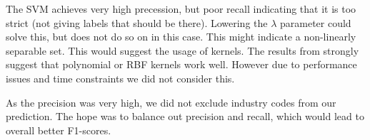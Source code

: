 \documentclass{article}
\begin{document}
The SVM achieves very high precession, but poor recall indicating that it is too strict (not giving labels that should be there). Lowering the $\lambda$ parameter could solve this, but does not do so on in this case. This might indicate a non-linearly separable set. This would suggest the usage of kernels. The results from \cite{joachims_text_1998} strongly suggest that polynomial or RBF kernels work well. However due to performance issues and time constraints we did not consider this.

As the precision was very high, we did not exclude industry codes from our prediction. The hope was to balance out precision and recall, which would lead to overall better F1-scores.

\printbibliography
\end{document}
